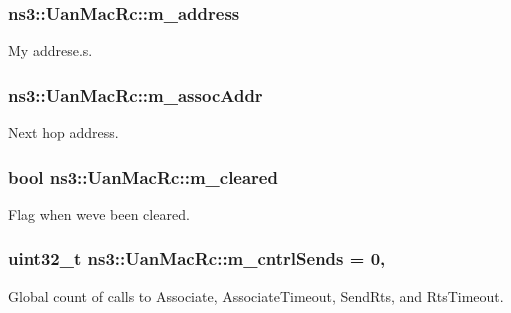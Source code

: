 \subsubsection[{\texorpdfstring{m\+\_\+address}{m_address}}]{ ns3\+::\+Uan\+Mac\+Rc\+::m\+\_\+address\hspace{0.3cm}{\ttfamily [private]}}\hypertarget{classns3_1_1UanMacRc_ac389a0236fcf75155c45a9a1cdf0f288}{}\label{classns3_1_1UanMacRc_ac389a0236fcf75155c45a9a1cdf0f288}


My addrese.\+s. 

\subsubsection[{\texorpdfstring{m\+\_\+assoc\+Addr}{m_assocAddr}}]{ ns3\+::\+Uan\+Mac\+Rc\+::m\+\_\+assoc\+Addr\hspace{0.3cm}{\ttfamily [private]}}\hypertarget{classns3_1_1UanMacRc_a67110fd422cdfab5b7d3b47fca059916}{}\label{classns3_1_1UanMacRc_a67110fd422cdfab5b7d3b47fca059916}


Next hop address. 

\subsubsection[{\texorpdfstring{m\+\_\+cleared}{m_cleared}}]{\setlength{\rightskip}{0pt plus 5cm}bool ns3\+::\+Uan\+Mac\+Rc\+::m\+\_\+cleared\hspace{0.3cm}{\ttfamily [private]}}\hypertarget{classns3_1_1UanMacRc_ad55b6c8cb49de788deeae8429bded858}{}\label{classns3_1_1UanMacRc_ad55b6c8cb49de788deeae8429bded858}


Flag when we\textquotesingle{}ve been cleared. 

\subsubsection[{\texorpdfstring{m\+\_\+cntrl\+Sends}{m_cntrlSends}}]{\setlength{\rightskip}{0pt plus 5cm}uint32\+\_\+t ns3\+::\+Uan\+Mac\+Rc\+::m\+\_\+cntrl\+Sends = 0\hspace{0.3cm}{\ttfamily [static]}, {\ttfamily [private]}}\hypertarget{classns3_1_1UanMacRc_a839e4af07d2bcffe634f6adb0e3e94ca}{}\label{classns3_1_1UanMacRc_a839e4af07d2bcffe634f6adb0e3e94ca}
Global count of calls to Associate, Associate\+Timeout, Send\+Rts, and Rts\+Timeout. 
